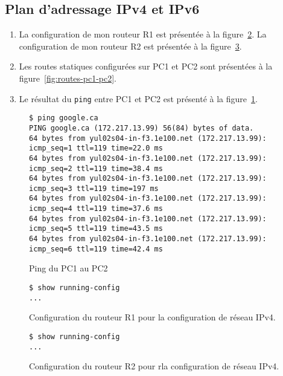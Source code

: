 \documentclass[]{article}
\begin{document}
\subsection*{Plan d'adressage IPv4 et IPv6}

\begin{enumerate}
      \item La configuration de mon routeur R1 est présentée à la figure~\ref{fig:ipv4-config-r1}. La configuration
            de mon routeur R2 est présentée à la figure~\ref{fig:ipv4-config-r2}.
      \item Les routes statiques configurées sur PC1 et PC2 sont présentées à la figure~\ref{fig:routes-pc1-pc2}.
      \item  Le résultat du \texttt{ping} entre PC1 et PC2 est présenté à la figure~\ref{fig:ping-pc1-pc2}.
\end{enumerate}


\begin{figure} 
      \centering
      \begin{lstlisting}
$ ping google.ca
PING google.ca (172.217.13.99) 56(84) bytes of data.
64 bytes from yul02s04-in-f3.1e100.net (172.217.13.99): icmp_seq=1 ttl=119 time=22.0 ms
64 bytes from yul02s04-in-f3.1e100.net (172.217.13.99): icmp_seq=2 ttl=119 time=38.4 ms
64 bytes from yul02s04-in-f3.1e100.net (172.217.13.99): icmp_seq=3 ttl=119 time=197 ms
64 bytes from yul02s04-in-f3.1e100.net (172.217.13.99): icmp_seq=4 ttl=119 time=37.6 ms
64 bytes from yul02s04-in-f3.1e100.net (172.217.13.99): icmp_seq=5 ttl=119 time=43.5 ms
64 bytes from yul02s04-in-f3.1e100.net (172.217.13.99): icmp_seq=6 ttl=119 time=42.4 ms
      \end{lstlisting}
      \caption[]{Ping du PC1 au PC2}
      \label{fig:ping-pc1-pc2}
\end{figure}

\begin{figure} 
      \centering
      \begin{lstlisting}
$ show running-config
...
      \end{lstlisting}
      \caption[]{Configuration du routeur R1 pour la configuration de réseau IPv4.}
      \label{fig:ipv4-config-r1}
\end{figure}

\begin{figure} 
      \centering
      \begin{lstlisting}
$ show running-config 
...
      \end{lstlisting}
      \caption[]{Configuration du routeur R2 pour rla configuration de réseau IPv4.}
      \label{fig:ipv4-config-r2}
\end{figure}
\end{document}
